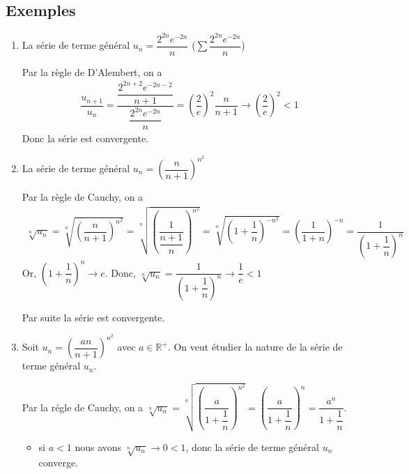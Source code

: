 \documentclass[letterpaper,10pt,french]{sphinxmanual}
\begin{document}
\subsection{Exemples}
\label{\detokenize{series:exemples}}\begin{enumerate}
%
\item {} 
\sphinxAtStartPar
La série de terme général \(u_n =\dfrac{2^{2n}e^{-2n}}{n}\) (\(\sum \dfrac{2^{2n}e^{-2n}}{n}\))

\sphinxAtStartPar
Par la règle de D’Alembert, on a
\begin{equation*}
\begin{split}
    \dfrac{u_{n+1}}{u_n}=\dfrac{\dfrac{2^{2n+2}e^{-2n-2}}{n+1}}{\dfrac{2^{2n}e^{-2n}}{n}}=\left(\dfrac{2}{e}\right)^2 \dfrac{n}{n+1} \to \left(\dfrac{2}{e}\right)^2 <1
    \end{split}
\end{equation*}
\sphinxAtStartPar
Donc la série est convergente.

\item {} 
\sphinxAtStartPar
La série de terme général \(u_n = (\dfrac{n}{n+1})^{n^2}\)

\sphinxAtStartPar
Par la règle de Cauchy, on a
\begin{equation*}
\begin{split}
    \sqrt[n]{u_n} = \sqrt[n]{\left(\dfrac{n}{n+1}\right)^{n^2}} = \sqrt[n]{\left(\dfrac{1}{\dfrac{n+1}{n}}\right)^{n^2}} = \sqrt[n]{\left(1+\dfrac{1}{n}\right)^{-n^2}}=\left(\dfrac{1}{1+n}\right)^{-n}=\dfrac{1}{\left(1+\dfrac{1}{n}\right)^n}
    \end{split}
\end{equation*}
\sphinxAtStartPar
Or, \((1+\dfrac{1}{n})^n \to e\). Donc, \(\sqrt[n]{u_n}= \dfrac{1}{(1+\dfrac{1}{n})^n} \to \dfrac{1}{e} < 1\)

\sphinxAtStartPar
Par suite la série est convergente.

\item {} 
\sphinxAtStartPar
Soit \(u_n = (\dfrac{an}{n+1})^{n^2}\) avec \(a\in \mathbb R^+\). On veut étudier la nature de la série de terme général \(u_n\).

\sphinxAtStartPar
Par la régle de Cauchy, on a \(\sqrt[n]{u_n} = \sqrt[n]{\left(\dfrac{a}{1+\dfrac{1}{n}}\right)^{n^2}} = \left(\dfrac{a}{1+\dfrac{1}{n}}\right)^{n}= \dfrac{a^n}{1+\dfrac{1}{n}}\).
\begin{itemize}
\item {} 
\sphinxAtStartPar
si \(a<1\) nous avons \(\sqrt[n]{u_n} \to 0 < 1\), donc la série de terme général \(u_n\) converge.


\end{itemize}
\end{enumerate}
\end{document}
